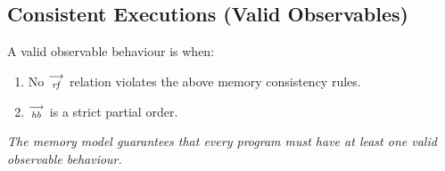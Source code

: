 
    \subsection{Consistent Executions (Valid Observables)}
        A valid observable behaviour is when:
            \begin{enumerate}
                \item No $\stackrel{\longrightarrow}{_\textit{rf}}$ relation violates the above memory consistency rules.
                \item $\stackrel{\longrightarrow}{_\textit{hb}}$ is a strict partial order.
            \end{enumerate} 
  
    \textit{The memory model guarantees that every program must have at least one valid observable behaviour.}
